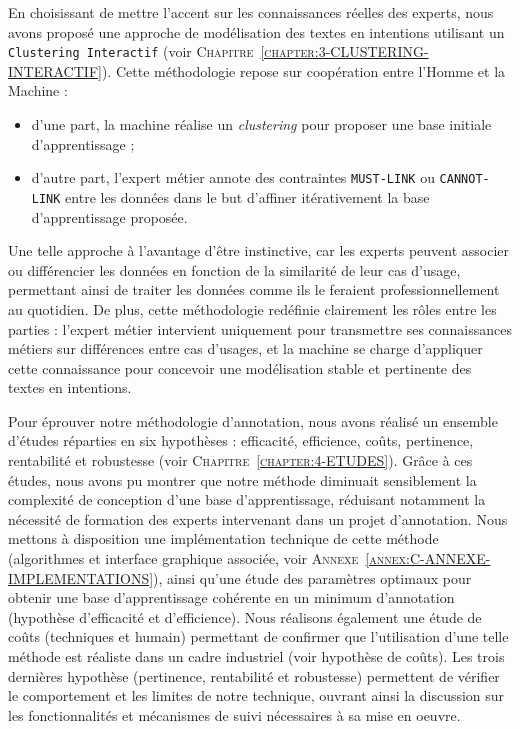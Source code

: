 		En choisissant de mettre l'accent sur les connaissances réelles des experts, nous avons proposé une approche de modélisation des textes en intentions utilisant un \texttt{Clustering Interactif} (voir \textsc{Chapitre~\ref{chapter:3-CLUSTERING-INTERACTIF}}).
		Cette méthodologie repose sur coopération entre l'Homme et la Machine :
		\begin{itemize}
			\item d'une part, la machine réalise un \textit{clustering} pour proposer une base initiale d'apprentissage ;
			\item d'autre part, l'expert métier annote des contraintes \texttt{MUST-LINK} ou \texttt{CANNOT-LINK} entre les données dans le but d'affiner itérativement la base d'apprentissage proposée.
		\end{itemize}
		Une telle approche à l'avantage d'être instinctive, car les experts peuvent associer ou différencier les données en fonction de la similarité de leur cas d'usage, permettant ainsi de traiter les données comme ils le feraient professionnellement au quotidien.
		De plus, cette méthodologie redéfinie clairement les rôles entre les parties : l'expert métier intervient uniquement pour transmettre ses connaissances métiers sur différences entre cas d'usages, et la machine se charge d'appliquer cette connaissance pour concevoir une modélisation stable et pertinente des textes en intentions.
		
		
		Pour éprouver notre méthodologie d'annotation, nous avons réalisé un ensemble d'études réparties en six hypothèses : efficacité, efficience, coûts, pertinence, rentabilité et robustesse (voir \textsc{Chapitre~\ref{chapter:4-ETUDES}}).
		Grâce à ces études, nous avons pu montrer que notre méthode diminuait sensiblement la complexité de conception d'une base d'apprentissage, réduisant notamment la nécessité de formation des experts intervenant dans un projet d'annotation.
		Nous mettons à disposition une implémentation technique de cette méthode (algorithmes et interface graphique associée, voir \textsc{Annexe~\ref{annex:C-ANNEXE-IMPLEMENTATIONS}}), ainsi qu'une étude des paramètres optimaux pour obtenir une base d'apprentissage cohérente en un minimum d'annotation (hypothèse d'efficacité et d'efficience).
		Nous réalisons également une étude de coûts (techniques et humain) permettant de confirmer que l'utilisation d'une telle méthode est réaliste dans un cadre industriel (voir hypothèse de coûts).
		Les trois dernières hypothèse (pertinence, rentabilité et robustesse) permettent de vérifier le comportement et les limites de notre technique, ouvrant ainsi la discussion sur les fonctionnalités et mécanismes de suivi nécessaires à sa mise en oeuvre.
		
